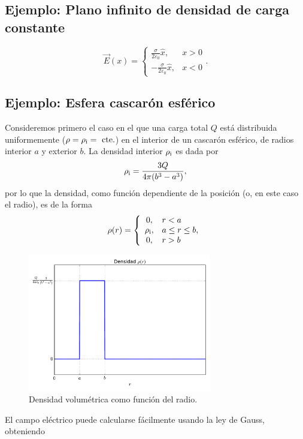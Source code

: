 \subsection{Ejemplo: Plano infinito de densidad de carga constante}
\begin{equation}
\vec{E}(x)=\left\{\begin{array}{rl}\frac{\sigma}{2\varepsilon_0}\hat{x},& x>0 \\
-\frac{\sigma}{2\varepsilon_0}\hat{x},& x<0 \end{array}\right. .
\end{equation}

\subsection{Ejemplo: Esfera cascarón esférico}
Consideremos primero el caso en el que una carga total $Q$ está distribuida uniformemente ($\rho=\rho_{\rm i}=\text{ cte.}$) en el interior de un cascarón esférico, de radios interior $a$ y exterior $b$.
La densidad interior $\rho_{\rm i}$ es dada por
\begin{equation}
\rho_{\rm i} = \frac{3Q}{4\pi(b^3-a^3)},
\end{equation}
por lo que la densidad, como función dependiente de la posición (o, en este caso el radio), es de la forma
\begin{equation}
\rho(r)=\left\{\begin{array}{cl}
0, & r<a\\
\rho_{\rm i}, & a\le r\le b,\\
0, & r>b
\end{array}\right.
\end{equation}
\begin{figure}[!h]
\centerline{\includegraphics[height=6cm]{fig/fig-esfera-hueca-densidad.pdf}}
\caption{Densidad volumétrica como función del radio.}
\label{fig_ehd}
\end{figure}
El campo eléctrico puede calcularse fácilmente usando la ley de Gauss, obteniendo
